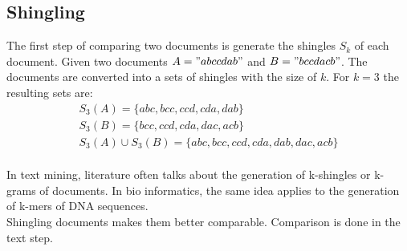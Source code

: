 \subsection{Shingling}

The first step of comparing two documents is generate the shingles $ S_k $ of each document. Given two documents $ A = "abccdab" $ and $ B = "bccdacb" $. The documents are  converted into a sets of shingles with the size of $ k $. For $ k = 3 $ the resulting sets are: \\

\begin{equation}
    \begin{split}
        S_3(A) = \{abc, bcc, ccd, cda, dab\} \\
        S_3(B) = \{bcc, ccd, cda, dac, acb\} \\
        S_3(A) \cup S_3(B) = \{abc, bcc, ccd, cda, dab, dac, acb\}
    \end{split}
\end{equation}\\

In text mining, literature often talks about the generation of k-shingles or k-grams of documents. In bio informatics, the same idea applies to the generation of k-mers of DNA sequences.\\

Shingling documents makes them better comparable. Comparison is done in the text step.\\